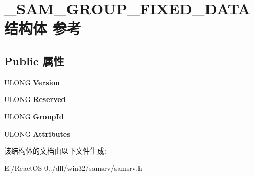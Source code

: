 \hypertarget{struct___s_a_m___g_r_o_u_p___f_i_x_e_d___d_a_t_a}{}\section{\+\_\+\+S\+A\+M\+\_\+\+G\+R\+O\+U\+P\+\_\+\+F\+I\+X\+E\+D\+\_\+\+D\+A\+T\+A结构体 参考}
\label{struct___s_a_m___g_r_o_u_p___f_i_x_e_d___d_a_t_a}
\subsection*{Public 属性}
\begin{DoxyCompactItemize}
\item 
\mbox{\label{struct___s_a_m___g_r_o_u_p___f_i_x_e_d___d_a_t_a_a5cb5764d1e68997f099f5a39ca2dd7b6}} 
U\+L\+O\+NG {\bfseries Version}
\item 
\mbox{\label{struct___s_a_m___g_r_o_u_p___f_i_x_e_d___d_a_t_a_a2a09f6378ae539acbb6faee212f14139}} 
U\+L\+O\+NG {\bfseries Reserved}
\item 
\mbox{\label{struct___s_a_m___g_r_o_u_p___f_i_x_e_d___d_a_t_a_a96a07ecec8270af8e323ffa1fba113ae}} 
U\+L\+O\+NG {\bfseries Group\+Id}
\item 
\mbox{\label{struct___s_a_m___g_r_o_u_p___f_i_x_e_d___d_a_t_a_ae604fea2e7cdec5cea12dbbbaac0035f}} 
U\+L\+O\+NG {\bfseries Attributes}
\end{DoxyCompactItemize}


该结构体的文档由以下文件生成\+:\begin{DoxyCompactItemize}
\item 
E\+:/\+React\+O\+S-\/0../dll/win32/samsrv/samsrv.\+h\end{DoxyCompactItemize}

